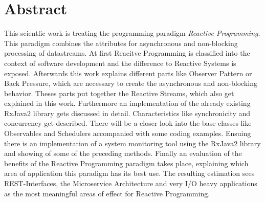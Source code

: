 \section*{Abstract} %
\label{cha:abtract}
This scientfic work is treating the programming paradigm \textit{Reactive 
Programming}. This paradigm combines the attributes for asynchronous and 
non-blocking processing of datastreams. At first Reacitve Programming is 
classified into the context of software development and the difference to 
Reactive Systems is exposed. Afterwards this work explains different parts like 
Observer Pattern or Back Pressure, which are necessary to create the 
asynchronous and non-blocking behavior. Theses parts put together the Reactive 
Streams, which also get explained in this work. Furthermore an implementation of 
the already existing RxJava2 library gets discussed in detail. Characteristics 
like synchronicity and concurrency get described. There will be a closer look 
into the base classes like Observables and Schedulers accompanied with some 
coding examples. Ensuing there is an implementation of a system monitoring tool 
using the RxJava2 library and showing of some of the preceding methods. Finally 
an evaluation of the benefits of the Reactive Programming paradigm takes place, 
explaining which area of application this paradigm has its best use. The 
resulting estimation sees REST-Interfaces, the Microservice Architecture and 
very I/O heavy applications as the most meaningful areas of effect for Reactive 
Programming.
 

